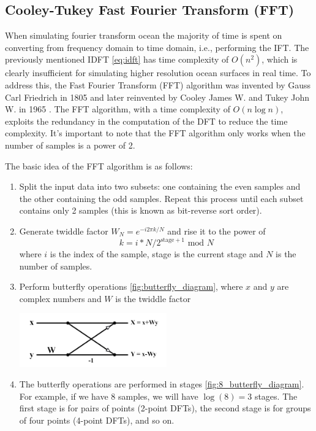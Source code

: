 \subsection{Cooley-Tukey Fast Fourier Transform (FFT)}
When simulating fourier transform ocean the majority of time is spent on converting from frequency domain to time domain, i.e., performing the IFT.
The previously mentioned IDFT \ref{eq:idft} has time complexity of $O(n^2)$, which is clearly insufficient for simulating higher resolution ocean surfaces in real time.
To address this, the Fast Fourier Transform (FFT) algorithm was invented by Gauss Carl Friedrich in 1805 \cite{gauss1866} and later reinvented by Cooley James W. and Tukey John W. in 1965 \cite{cooley1965}. 
The FFT algorithm, with a time complexity of $O(n\log n)$, exploits the redundancy in the computation of the DFT to reduce the time complexity. It's important to note that the FFT algorithm only works when the number of samples is a power of 2.

The basic idea of the FFT algorithm is as follows:
\begin{enumerate}
    \item Split the input data into two subsets: one containing the even samples and the other containing the odd samples. Repeat this process until each subset contains only 2 samples (this is known as bit-reverse sort order).
    \item Generate twiddle factor $W_N = e^{-i 2 \pi k / N}$ and rise it to the power of \\
    \begin{equation}
        k = i * N / 2^{\text{stage} + 1} \text{ mod } N
    \end{equation}
    where $i$ is the index of the sample, stage is the current stage and $N$ is the number of samples.
    \item Perform butterfly operations \ref{fig:butterfly_diagram}, where $x$ and $y$ are complex numbers and $W$ is the twiddle factor

    \begin{minipage}{1\textwidth}
        \centering
        \includegraphics[width=0.5\textwidth]{"images/butterfly_diagram.png"}
        \label{fig:butterfly_diagram}
    \end{minipage}

    \item The butterfly operations are performed in stages \ref{fig:8_butterfly_diagram}. For example, if we have 8 samples, we will have $\log(8) = 3 $ stages. The first stage is for pairs of points (2-point DFTs), the second stage is for groups of four points (4-point DFTs), and so on.
\end{enumerate}

